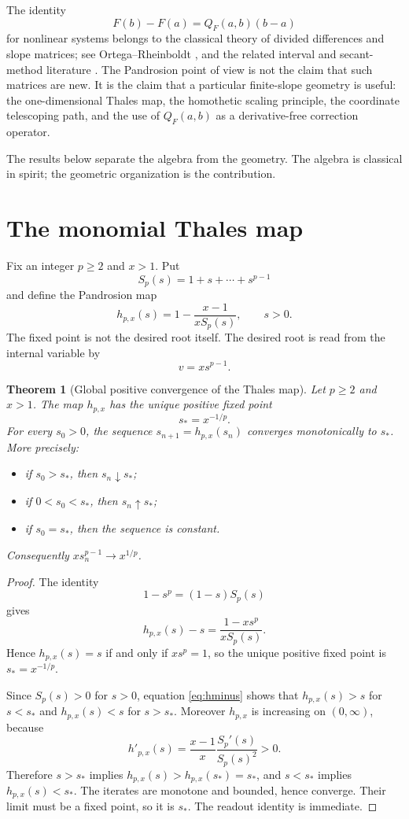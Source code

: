 \documentclass[11pt]{article}
\newtheorem{theorem}{Theorem}[section]
\theoremstyle{definition}
\theoremstyle{remark}
\begin{document}
The identity
\[
        F(b)-F(a)=Q_F(a,b)(b-a)
\]
for nonlinear systems belongs to the classical theory of divided differences and slope matrices; see Ortega--Rheinboldt \cite{OrtegaRheinboldt}, and the related interval and secant-method literature \cite{Krawczyk,Neumaier,PotraPtak}.  The Pandrosion point of view is not the claim that such matrices are new.  It is the claim that a particular finite-slope geometry is useful: the one-dimensional Thales map, the homothetic scaling principle, the coordinate telescoping path, and the use of $Q_F(a,b)$ as a derivative-free correction operator.

The results below separate the algebra from the geometry.  The algebra is classical in spirit; the geometric organization is the contribution.

\section{The monomial Thales map}

Fix an integer $p\geq 2$ and $x>1$.  Put
\[
        S_p(s)=1+s+\cdots+s^{p-1}
\]
and define the Pandrosion map
\begin{equation}\label{eq:hp}
        h_{p,x}(s)=1-\frac{x-1}{xS_p(s)},\qquad s>0.
\end{equation}
The fixed point is not the desired root itself.  The desired root is read from the internal variable by
\[
        v=x s^{p-1}.
\]

\begin{theorem}[Global positive convergence of the Thales map]\label{thm:global-monomial}
Let $p\geq 2$ and $x>1$.  The map $h_{p,x}$ has the unique positive fixed point
\[
        s_* = x^{-1/p}.
\]
For every $s_0>0$, the sequence $s_{n+1}=h_{p,x}(s_n)$ converges monotonically to $s_*$.  More precisely:
\begin{itemize}
\item if $s_0>s_*$, then $s_n\downarrow s_*$;
\item if $0<s_0<s_*$, then $s_n\uparrow s_*$;
\item if $s_0=s_*$, then the sequence is constant.
\end{itemize}
Consequently $x s_n^{p-1}\to x^{1/p}$.
\end{theorem}

\begin{proof}
The identity
\[
        1-s^p=(1-s)S_p(s)
\]
gives
\begin{equation}\label{eq:hminus}
        h_{p,x}(s)-s=\frac{1-xs^p}{xS_p(s)}.
\end{equation}
Hence $h_{p,x}(s)=s$ if and only if $xs^p=1$, so the unique positive fixed point is $s_*=x^{-1/p}$.

Since $S_p(s)>0$ for $s>0$, equation \eqref{eq:hminus} shows that $h_{p,x}(s)>s$ for $s<s_*$ and $h_{p,x}(s)<s$ for $s>s_*$.  Moreover $h_{p,x}$ is increasing on $(0,\infty)$, because
\[
        h'_{p,x}(s)=\frac{x-1}{x}\frac{S_p'(s)}{S_p(s)^2}>0.
\]
Therefore $s>s_*$ implies $h_{p,x}(s)>h_{p,x}(s_*)=s_*$, and $s<s_*$ implies $h_{p,x}(s)<s_*$.  The iterates are monotone and bounded, hence converge.  Their limit must be a fixed point, so it is $s_*$.  The readout identity is immediate.
\end{proof}
\end{document}
